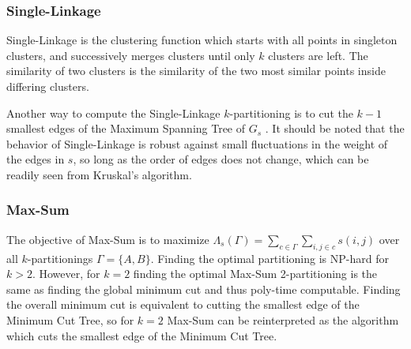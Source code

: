 \documentclass[twoside,11pt]{article}
\begin{document}
\subsubsection{Single-Linkage}

Single-Linkage is the clustering function which starts with all points in singleton clusters, and successively merges clusters until only
$k$ clusters are left. The similarity of two clusters is the similarity of the two most similar points inside differing clusters. 
\begin{comment}
Single-Linkage is made formal
in algorithm \ref{alg:SL}.

\algsetup{indent=2em}
\newcommand{\SingleLinkage}{\ensuremath{\mbox{\sc Single-Linkage}}}
\begin{algorithm}[h!]
\caption{$\SingleLinkage(s, k)$}\label{alg:SL}
\begin{algorithmic} [4]
\STATE Input: $s = \langle e_1, e_2, \ldots, e_{n \choose 2} \rangle$.
\STATE Output: The Single-Linkage $k$-partitioning.
\medskip
\STATE $\Gamma \leftarrow \{ \{1\},\{2\}, \ldots, \{n\} \}$
\STATE $i \leftarrow 1$
\WHILE{$|\Gamma| > k$}
	\STATE let $x$, $y$ be the two ends of $e_i$
	\STATE let $c_x \in \Gamma$, $c_y \in \Gamma$ be the clusters of $x$ and $y$
	\IF{$c_x \neq c_y$} \label{special}
		\STATE Merge $c_x$ and $c_y$
		\STATE $\Gamma \leftarrow (\Gamma \backslash c_x , c_y) \cup \{ c_x \cup c_y \} $
	\ENDIF
	\STATE $i \leftarrow i+1$
\ENDWHILE
\STATE Output $\Gamma$
\end{algorithmic}
\end{algorithm}
\end{comment}

Another way to compute the Single-Linkage $k$-partitioning is to cut the $k-1$ smallest edges of the Maximum Spanning Tree of $G_s$ \citep{mstsl}. It should be noted that the behavior of Single-Linkage is robust against small fluctuations in the weight of the edges in $s$, so long as the order of edges does not change, which can be readily seen from Kruskal's algorithm. 

\subsubsection{Max-Sum}

The objective of Max-Sum is to maximize $\Lambda_s(\Gamma) =  \sum_{c \in \Gamma} \sum_{i,j \in c}s(i, j)$ over all $k$-partitionings $\Gamma = \{A,B\}$. 
Finding the optimal partitioning is NP-hard for $k > 2$. However, for $k=2$ finding the optimal Max-Sum 2-partitioning is the same as finding the global  minimum cut and thus poly-time computable. Finding the overall minimum cut is equivalent to cutting the smallest edge of the Minimum Cut Tree, so for $k=2$ Max-Sum can be reinterpreted as the algorithm which cuts the smallest edge of the Minimum Cut Tree.
\end{document}
